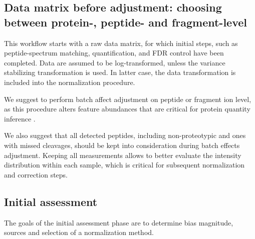 \documentclass[num-refs]{wiley-article}
\begin{document}

\subsection{Data matrix before adjustment: choosing between protein-, peptide- and fragment-level}


This workflow starts with a raw data matrix, for which initial steps, such as peptide-spectrum matching, quantification, and FDR control have been completed. Data are assumed to be log-transformed, unless the variance stabilizing transformation \cite{Durbin2002} is used. In latter case, the data transformation is included into the normalization procedure. 

We suggest to perform batch affect adjustment on peptide or fragment ion level, as this procedure alters feature abundances that are critical for protein quantity inference \cite{Clough:2012aa, Teo:2015aa}.  


We also suggest that all detected peptides, including non-proteotypic and ones with missed cleavages, should be kept into consideration during batch effects adjustment. Keeping all measurements allows to better evaluate the intensity distribution within each sample, which is critical for subsequent normalization and correction steps.

\subsection{Initial assessment}
The goals of the initial assessment phase are to determine bias magnitude, sources and selection of a normalization method.
\end{document}
